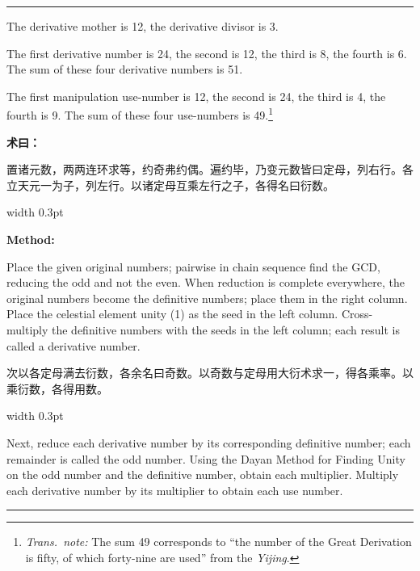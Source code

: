 \documentclass[10pt,a4paper]{article}
\newcommand{\cnlabel}[1]{\textcolor{labelcolor}{\textbf{#1}}}
\newcommand{\enlabel}[1]{\textcolor{labelcolor}{\textbf{#1}}}
\newcommand{\transnote}[1]{\footnote{\textit{Trans.\ note:} #1}}
\newenvironment{problemsection}{%
  \medskip\par\noindent\textcolor{rulecolor}{\rule{\textwidth}{0.4pt}}\par\smallskip%
}{\par\smallskip\noindent\textcolor{rulecolor}{\rule{\textwidth}{0.4pt}}\par\medskip}
\begin{document}
\begin{problemsection}
\begin{minipage}[t]{0.47\textwidth}
\begin{flushleft}
The derivative mother is 12, the derivative divisor is 3.

The first derivative number is 24, the second is 12, the third is 8, the fourth is 6. The sum of these four derivative numbers is 51.

The first manipulation use-number is 12, the second is 24, the third is 4, the fourth is 9. The sum of these four use-numbers is 49.\transnote{The sum 49 corresponds to ``the number of the Great Derivation is fifty, of which forty-nine are used'' from the \textit{Yijing}.}
\end{flushleft}
\end{minipage}

\vspace{0.3em}

\noindent\begin{minipage}[t]{0.47\textwidth}
\begin{flushleft}
\small
\cnlabel{术曰：}

置诸元数，两两连环求等，约奇弗约偶。遍约毕，乃变元数皆曰定母，列右行。各立天元一为子，列左行。以诸定母互乘左行之子，各得名曰衍数。
\end{flushleft}
\end{minipage}%
\hfill\vrule width 0.3pt\hfill%
\begin{minipage}[t]{0.47\textwidth}
\begin{flushleft}
\small
\enlabel{Method:}

Place the given original numbers; pairwise in chain sequence find the GCD, reducing the odd and not the even. When reduction is complete everywhere, the original numbers become the definitive numbers; place them in the right column. Place the celestial element unity (1) as the seed in the left column. Cross-multiply the definitive numbers with the seeds in the left column; each result is called a derivative number.
\end{flushleft}
\end{minipage}

\vspace{0.3em}

\noindent\begin{minipage}[t]{0.47\textwidth}
\begin{flushleft}
\small
次以各定母满去衍数，各余名曰奇数。以奇数与定母用大衍术求一，得各乘率。以乘衍数，各得用数。
\end{flushleft}
\end{minipage}%
\hfill\vrule width 0.3pt\hfill%
\begin{minipage}[t]{0.47\textwidth}
\begin{flushleft}
\small
Next, reduce each derivative number by its corresponding definitive number; each remainder is called the odd number. Using the Dayan Method for Finding Unity on the odd number and the definitive number, obtain each multiplier. Multiply each derivative number by its multiplier to obtain each use number.
\end{flushleft}
\end{minipage}

\end{problemsection}
\end{document}
